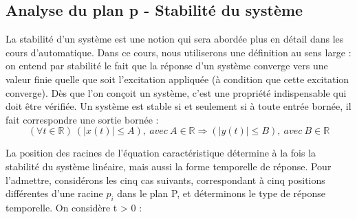 \documentclass[]{book}
\begin{document}
{	\subsection{Analyse du plan p - Stabilité du système}
	La stabilité d'un système est une notion qui sera abordée plus en détail dans les cours d'automatique. Dans ce cours, nous utiliserons une définition au sens large : on entend par stabilité le fait que la réponse d'un système converge vers une valeur finie quelle que soit l'excitation appliquée (à condition que cette excitation converge). Dès que l'on conçoit un système, c'est une propriété indispensable qui doit être vérifiée.
	Un système est stable si et seulement si à toute entrée bornée, il fait correspondre une sortie bornée :
	\begin{equation}
	(\forall t \in \mathbb{R})~(|x(t)| \leq A),~avec~A \in \mathbb{R} \Rightarrow (|y(t)| \leq B),~avec~B \in \mathbb{R}
	\end{equation}
	
	
	La position des racines de l'équation caractéristique détermine à la fois la stabilité du système linéaire, mais aussi la forme temporelle de réponse. Pour l'admettre, considérons les cinq cas suivants, correspondant à cinq positions différentes d'une racine $p_{i}$ dans le plan P, et déterminons le type de réponse temporelle. On considère t > 0 :
	
}
\end{document}
